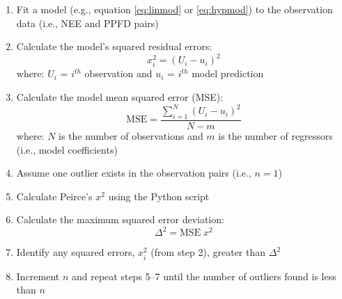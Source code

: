 \begin{enumerate}
    \item Fit a model (e.g., equation \ref{eq:linmod} or \ref{eq:hypmod}) to
          the observation data (i.e., NEE and PPFD pairs)
    \item Calculate the model's squared residual errors:\\
          \begin{equation}
          \label{eq:residerr}
              x_{i}^{2} = \left(U_{i}-u_{i}\right)^{2}
          \end{equation}
          where: $U_{i}$ = $i^{th}$ observation and $u_{i}$ = $i^{th}$ model 
          prediction
    \item Calculate the model mean squared error (MSE):\\
          \begin{equation}
          \label{eq:mse}
              \text{MSE} = \frac{\sum_{i=1}^{N}\left(U_{i}-u_{i}\right)^{2}}
                                {N-m}
          \end{equation}
          where: $N$ is the number of observations and $m$ is the number of 
          regressors (i.e., model coefficients)
    \item Assume one outlier exists in the observation pairs (i.e., $n=1$)
    \item Calculate Peirce's $x^{2}$ using the Python script
    \item Calculate the maximum squared error deviation:\\
          \begin{equation}
          \label{eq:delta2}
              \Delta^{2} = \text{MSE}\; x^{2}
          \end{equation}
    \item Identify any squared errors, $x_{i}^{2}$ (from step 2), greater than 
          $\Delta^{2}$
    \item Increment $n$ and repeat steps 5--7 until the number of outliers 
          found is less than $n$
\end{enumerate}

